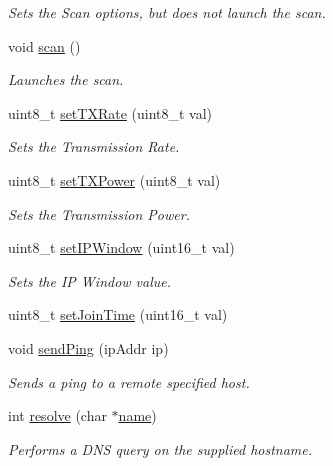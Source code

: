 \begin{DoxyCompactItemize}
\begin{DoxyCompactList}\small\item\em Sets the Scan options, but does not launch the scan. \end{DoxyCompactList}\item 
void \hyperlink{class_wasp_w_i_f_i_a06350bb18d55a43ad02c18cb87a575e0}{scan} ()
\begin{DoxyCompactList}\small\item\em Launches the scan. \end{DoxyCompactList}\item 
uint8\+\_\+t \hyperlink{class_wasp_w_i_f_i_ab1283eabe3c8921efcf36c0ac5967229}{set\+T\+X\+Rate} (uint8\+\_\+t val)
\begin{DoxyCompactList}\small\item\em Sets the Transmission Rate. \end{DoxyCompactList}\item 
uint8\+\_\+t \hyperlink{class_wasp_w_i_f_i_a0fb355d61a34b565f3136e0948bbc827}{set\+T\+X\+Power} (uint8\+\_\+t val)
\begin{DoxyCompactList}\small\item\em Sets the Transmission Power. \end{DoxyCompactList}\item 
uint8\+\_\+t \hyperlink{class_wasp_w_i_f_i_a1738c5008aabc7f542d0b5bbd1c99416}{set\+I\+P\+Window} (uint16\+\_\+t val)
\begin{DoxyCompactList}\small\item\em Sets the IP Window value. \end{DoxyCompactList}\item 
uint8\+\_\+t \hyperlink{class_wasp_w_i_f_i_ad0cc0349c89e08a10252992c0935f6d9}{set\+Join\+Time} (uint16\+\_\+t val)
\item 
void \hyperlink{class_wasp_w_i_f_i_ae6a481f7e5c40fd726dc598262867c95}{send\+Ping} (ip\+Addr ip)
\begin{DoxyCompactList}\small\item\em Sends a ping to a remote specified host. \end{DoxyCompactList}\item 
int \hyperlink{class_wasp_w_i_f_i_a89dd2032471f286882c35d2230f90b07}{resolve} (char $\ast$\hyperlink{_sd_fat_structs_8h_a30308c9b983377042fd2cc8900454fb1}{name})
\begin{DoxyCompactList}\small\item\em Performs a D\+NS query on the supplied hostname. \end{DoxyCompactList}\item 

\end{DoxyCompactItemize}
